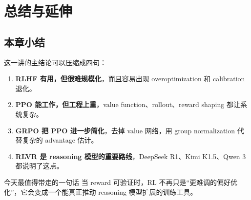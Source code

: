 \section{总结与延伸}

\subsection{本章小结}

这一讲的主结论可以压缩成四句：
\begin{enumerate}
    \item \textbf{RLHF 有用，但很难规模化}，而且容易出现 overoptimization 和 calibration 退化。
    \item \textbf{PPO 能工作，但工程上重}，value function、rollout、reward shaping 都让系统复杂。
    \item \textbf{GRPO 把 PPO 进一步简化}，去掉 value 网络，用 group normalization 代替复杂的 advantage 估计。
    \item \textbf{RLVR 是 reasoning 模型的重要路线}，DeepSeek R1、Kimi K1.5、Qwen 3 都说明了这点。
\end{enumerate}

\begin{importantbox}{今天最值得带走的一句话}
当 reward 可验证时，RL 不再只是“更难调的偏好优化”，它会变成一个能真正推动 reasoning 模型扩展的训练工具。
\end{importantbox}


